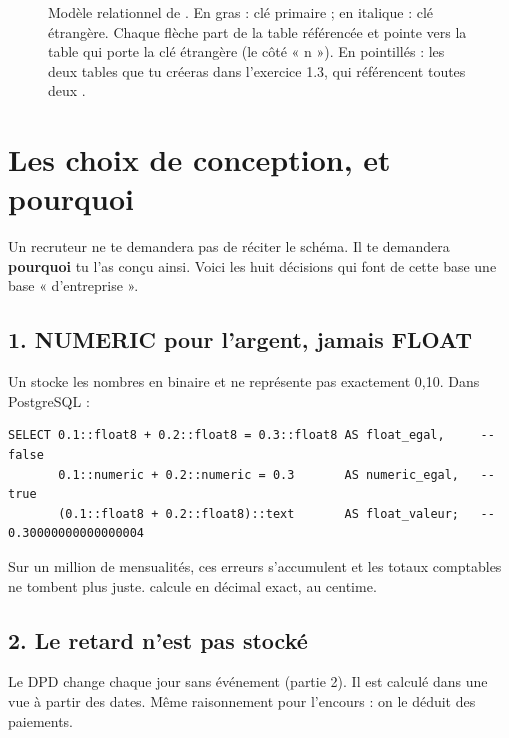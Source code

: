 \begin{figure}[p]
\caption{Modèle relationnel de . En gras : clé primaire ; en italique : clé
étrangère. Chaque flèche part de la table référencée et pointe vers la table qui porte la clé étrangère
(le côté « n »). En pointillés : les deux tables que tu créeras dans
l'exercice 1.3, qui référencent toutes deux .}
\label{fig:mld}
\end{figure}

\section{Les choix de conception, et pourquoi}

Un recruteur ne te demandera pas de réciter le schéma. Il te demandera \textbf{pourquoi} tu l'as conçu
ainsi. Voici les huit décisions qui font de cette base une base « d'entreprise ».

\subsection*{1. NUMERIC pour l'argent, jamais FLOAT}
Un  stocke les nombres en binaire et ne représente pas exactement 0,10. Dans PostgreSQL :

\begin{lstlisting}[style=sql]
SELECT 0.1::float8 + 0.2::float8 = 0.3::float8 AS float_egal,     -- false
       0.1::numeric + 0.2::numeric = 0.3       AS numeric_egal,   -- true
       (0.1::float8 + 0.2::float8)::text       AS float_valeur;   -- 0.30000000000000004
\end{lstlisting}
Sur un million de mensualités, ces erreurs s'accumulent et les totaux comptables ne tombent plus juste.
 calcule en décimal exact, au centime.

\subsection*{2. Le retard n'est pas stocké}
Le DPD change chaque jour sans événement (partie 2). Il est calculé dans une vue à partir des dates.
Même raisonnement pour l'encours : on le déduit des paiements.

